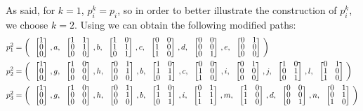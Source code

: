 As said, for $k=1$, $p_i^k=p_i$, so in order to better illustrate the
construction of $p_i^k$, we choose $k=2$. Using  we can
obtain the following modified paths: 
\begin{align*}
  p_1^2&= \left(\colvec{1\\0\\0},a,\colvec{1&1\\0&1\\0&0},b,\colvec{1&0\\1&1\\0&1},c,\colvec{0&0\\1&0\\1&0},d,\colvec{0&0\\0&0\\0&1},e,\colvec{0&1\\0&0\\0&0}\right) \\
  p_2^2&= \left(\colvec{1\\0\\0},g,\colvec{1&0\\0&0\\0&0},h,\colvec{0&1\\0&1\\0&0},b,\colvec{1&0\\1&1\\0&1},c,\colvec{0&0\\1&0\\1&0},i,\colvec{0&1\\0&0\\0&0},j,\colvec{1&0\\0&1\\0&1},l,\colvec{0&1\\1&0\\1&0}\right) \\
  p_3^2&= \left(\colvec{1\\0\\0},g,\colvec{1&0\\0&0\\0&0},h,\colvec{0&1\\0&1\\0&0},b,\colvec{1&0\\1&1\\0&1},i,\colvec{0&1\\1&1\\1&1},m,\colvec{1&0\\1&0\\1&0},d,\colvec{0&0\\0&0\\0&1},n,\colvec{0&1\\0&1\\1&0}\right) \\
\end{align*}

